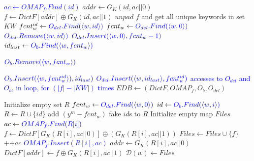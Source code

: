 \documentclass[sigconf]{acmart}
\newcommand{\pair}[2]{{\langle \ensuremath{#1, #2} \rangle}}
\newcommand{\DB}[1]{\mathcal{D}(#1)}
\newcommand{\vol}[1]{\lvert{#1}\rvert}
\newcommand{\Orionp}{\textsc{Orion}$^{+}$ }
\newcommand{\tblue}[1]{\textcolor{blue}{#1}}
\begin{document}
\begin{algorithm}
\caption{\Orionp $(K,\sigma; EDB)\leftarrow Delete(K,\sigma,(id,\bot);EDB)$}\label{alg:orionpdelete}
\begin{algorithmic}[1]
 \State \tblue{$ac \gets OMAP_f.Find(id)$}
\State $addr \gets G_K(id,ac||0)$
  \State $f \gets DictF[addr] \oplus G_K(id,ac||1)$
  \label{opinsalgo:delblocks}
\State $unpad$ $f$ and get all unique keywords in set $KW$ 
 \State $fcnt_{w}^{id} \gets \tblue{ O_{del}.Find(\pair{w}{id})}$  \label{opdelalg:getfcntidw}
\State $fcnt_{w} \gets  \tblue{O_{del}.Find(\pair{w}{0})}$ \label{opdelalg:getfcntw}
\State $ \tblue{O_{del}.Remove(\pair{w}{id})}$ \label{opdelalg:removeidw}
 \State $ \tblue{O_{del}.Insert(\pair{w}{0},fcnt_{w}-1)}$ \label{opdelalg:setfcntw}
\State $ id_{last} \gets \tblue{ O_{b}.Find(\pair{w}{fcnt_w})}$\label{opdelalg:getlastids}

 \State $ \tblue{O_{b}.Remove(\pair{w}{fcnt_w})}$\label{opdelalg:remlastids}
 
   
 
    \State $ \tblue{O_{b}.Insert(\pair{w}{fcnt_w^{id}}),id_{last})}$\label{opdelalg:updtdelids}
  \State $ \tblue{O_{del}.Insert(\pair{w}{id_{last}},fcnt_{w}^{id})}$\label{opdelalg:updtfcntidw}
  \EndIf
  \EndFor
\State \tblue{accesses to $O_{del}$ and $O_{b}$, in loop, for $(\vol{f}-\vol{KW})$ times} \label{opdelalgo:fake}
\State $EDB \gets (DictF,OMAP_{f},O_{b},O_{del})$
\end{algorithmic}
\end{algorithm}
\label{Algo:Orion+delete}



\begin{algorithm}
\caption{\Orionp $\DB{w}\leftarrow Search(K,\sigma,w;EDB)$}\label{alg:orionpsearch}
\begin{algorithmic}[1]
\State Initialize empty set $R$
\State $fcnt_{w} \gets \tblue{O_{del}.Find(\pair{w}{0})}$
   \State $id \gets \tblue{O_{b}.Find(\pair{w}{i})}$
   \State $R \gets R \cup \{id\}$
\EndFor
 \State{\tblue{$(y^m-fcnt_w)$ fake accesses to $O_{b}$}} 
 \State add $(y^m-fcnt_w)$ fake $id$s to $R$
 \State Initialize empty map $Files$
\State $ac \gets \tblue{OMAP_f.Find(R[i])}$
\State $f \gets DictF[G_K(R[i],ac||0)] \oplus (G_K(R[i],ac||1))$
\State $Files \gets Files \cup \{f\}$
\State $\texttt{++}ac$
\State \tblue{$OMAP_f.Insert(R[i],ac)$}
\State $addr \gets G_K(R[i],ac||0)$
\State $DictF[addr] \gets f \oplus G_K(R[i],ac||1)$
  \EndFor
\State $\DB{w} \gets Files$
 
\end{algorithmic}
\end{algorithm}
\label{Algo:Orion+Search}
\end{document}
